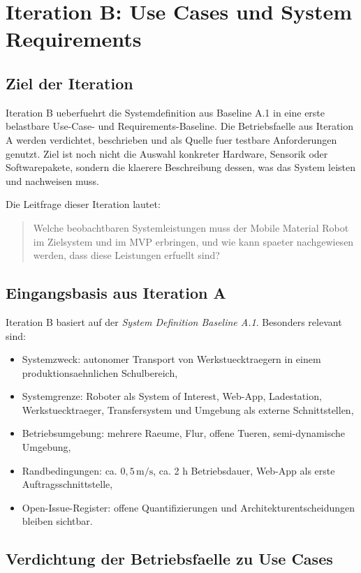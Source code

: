 \chapter{Iteration B: Use Cases und System Requirements}
\label{chap:iteration-b}

\section{Ziel der Iteration}

Iteration B ueberfuehrt die Systemdefinition aus Baseline A.1 in eine erste belastbare Use-Case- und Requirements-Baseline. Die Betriebsfaelle aus Iteration A werden verdichtet, beschrieben und als Quelle fuer testbare Anforderungen genutzt. Ziel ist noch nicht die Auswahl konkreter Hardware, Sensorik oder Softwarepakete, sondern die klaerere Beschreibung dessen, was das System leisten und nachweisen muss.

Die Leitfrage dieser Iteration lautet:
\begin{quote}
Welche beobachtbaren Systemleistungen muss der Mobile Material Robot im Zielsystem und im MVP erbringen, und wie kann spaeter nachgewiesen werden, dass diese Leistungen erfuellt sind?
\end{quote}

\section{Eingangsbasis aus Iteration A}

Iteration B basiert auf der \emph{System Definition Baseline A.1}. Besonders relevant sind:
\begin{itemize}
  \item Systemzweck: autonomer Transport von Werkstuecktraegern in einem produktionsaehnlichen Schulbereich,
  \item Systemgrenze: Roboter als System of Interest, Web-App, Ladestation, Werkstuecktraeger, Transfersystem und Umgebung als externe Schnittstellen,
  \item Betriebsumgebung: mehrere Raeume, Flur, offene Tueren, semi-dynamische Umgebung,
  \item Randbedingungen: ca. $0{,}5\,\mathrm{m/s}$, ca. 2 h Betriebsdauer, Web-App als erste Auftragsschnittstelle,
  \item Open-Issue-Register: offene Quantifizierungen und Architekturentscheidungen bleiben sichtbar.
\end{itemize}

\section{Verdichtung der Betriebsfaelle zu Use Cases}

